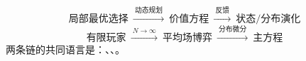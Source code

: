 \begin{takeaway}[全课程最后一页]
\[
\boxed{
\text{局部最优选择}
\ \xrightarrow{\ \text{动态规划}\ }\ 
\text{价值方程}
\ \xrightarrow{\ \text{反馈}\ }\ 
\text{状态/分布演化}
}
\]
\[
\boxed{
\text{有限玩家}
\ \xrightarrow{\ N\to\infty\ }\ 
\text{平均场博弈}
\ \xrightarrow{\ \text{分布微分}\ }\ 
\text{主方程}
}
\]
两条链的共同语言是：、、。
\end{takeaway}
